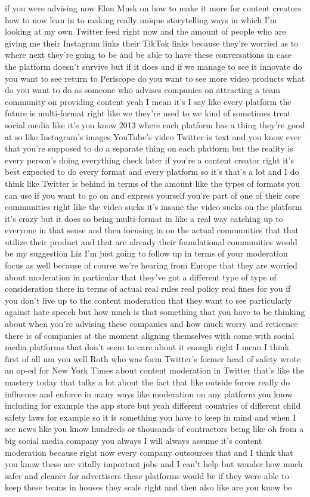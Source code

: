 \documentclass{article}%
\begin{document}
if you were advising now Elon Musk on how to make it more for content creators how to now lean in to making really unique storytelling ways in which I'm looking at my own Twitter feed right now and the amount of people who are giving me their Instagram links their TikTok links because they're worried as to where next they're going to be and be able to have these conversations in case the platform doesn't survive but if it does and if we manage to see it innovate do you want to see return to Periscope do you want to see more video products what do you want to do as someone who advises companies on attracting a team community on providing content yeah I mean it's I say like every platform the future is multi{-}format right like we they're used to we kind of sometimes treat social media like it's you know 2013 where each platform has a thing they're good at so like Instagram's images YouTube's video Twitter is text and you know ever that you're supposed to do a separate thing on each platform but the reality is every person's doing everything check later if you're a content creator right it's best expected to do every format and every platform so it's that's a lot and I do think like Twitter is behind in terms of the amount like the types of formats you can use if you want to go on and express yourself you're part of one of their core communities right like the video sucks it's insane the video sucks on the platform it's crazy but it does so being multi{-}format in like a real way catching up to everyone in that sense and then focusing in on the actual communities that that utilize their product and that are already their foundational communities would be my suggestion Liz I'm just going to follow up in terms of your moderation focus as well because of course we're hearing from Europe that they are worried about moderation in particular that they've got a different type of type of consideration there in terms of actual real rules real policy real fines for you if you don't live up to the content moderation that they want to see particularly against hate speech but how much is that something that you have to be thinking about when you're advising these companies and how much worry and reticence there is of companies at the moment aligning themselves with come with social media platforms that don't seem to care about it enough right I mean I think first of all um you well Roth who was form Twitter's former head of safety wrote an op{-}ed for New York Times about content moderation in Twitter that's like the mastery today that talks a lot about the fact that like outside forces really do influence and enforce in many ways like moderation on any platform you know including for example the app store but yeah different countries of different child safety laws for example so it is something you have to keep in mind and when I see news like you know hundreds or thousands of contractors being like oh from a big social media company you always I will always assume it's content moderation because right now every company outsources that and I think that you know these are vitally important jobs and I can't help but wonder how much safer and cleaner for advertisers these platforms would be if they were able to keep these teams in houses they scale right and then also like are you know be 
\end{document}
